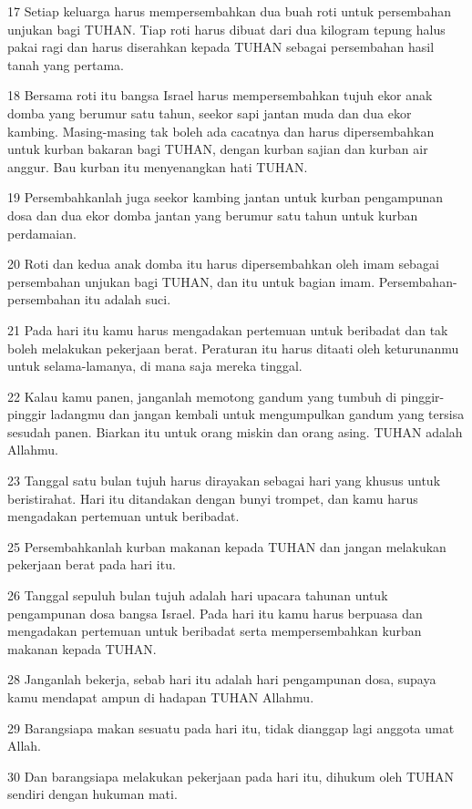 \par 17 Setiap keluarga harus mempersembahkan dua buah roti untuk persembahan unjukan bagi TUHAN. Tiap roti harus dibuat dari dua kilogram tepung halus pakai ragi dan harus diserahkan kepada TUHAN sebagai persembahan hasil tanah yang pertama.
\par 18 Bersama roti itu bangsa Israel harus mempersembahkan tujuh ekor anak domba yang berumur satu tahun, seekor sapi jantan muda dan dua ekor kambing. Masing-masing tak boleh ada cacatnya dan harus dipersembahkan untuk kurban bakaran bagi TUHAN, dengan kurban sajian dan kurban air anggur. Bau kurban itu menyenangkan hati TUHAN.
\par 19 Persembahkanlah juga seekor kambing jantan untuk kurban pengampunan dosa dan dua ekor domba jantan yang berumur satu tahun untuk kurban perdamaian.
\par 20 Roti dan kedua anak domba itu harus dipersembahkan oleh imam sebagai persembahan unjukan bagi TUHAN, dan itu untuk bagian imam. Persembahan-persembahan itu adalah suci.
\par 21 Pada hari itu kamu harus mengadakan pertemuan untuk beribadat dan tak boleh melakukan pekerjaan berat. Peraturan itu harus ditaati oleh keturunanmu untuk selama-lamanya, di mana saja mereka tinggal.
\par 22 Kalau kamu panen, janganlah memotong gandum yang tumbuh di pinggir-pinggir ladangmu dan jangan kembali untuk mengumpulkan gandum yang tersisa sesudah panen. Biarkan itu untuk orang miskin dan orang asing. TUHAN adalah Allahmu.
\par 23 Tanggal satu bulan tujuh harus dirayakan sebagai hari yang khusus untuk beristirahat. Hari itu ditandakan dengan bunyi trompet, dan kamu harus mengadakan pertemuan untuk beribadat.
\par 25 Persembahkanlah kurban makanan kepada TUHAN dan jangan melakukan pekerjaan berat pada hari itu.
\par 26 Tanggal sepuluh bulan tujuh adalah hari upacara tahunan untuk pengampunan dosa bangsa Israel. Pada hari itu kamu harus berpuasa dan mengadakan pertemuan untuk beribadat serta mempersembahkan kurban makanan kepada TUHAN.
\par 28 Janganlah bekerja, sebab hari itu adalah hari pengampunan dosa, supaya kamu mendapat ampun di hadapan TUHAN Allahmu.
\par 29 Barangsiapa makan sesuatu pada hari itu, tidak dianggap lagi anggota umat Allah.
\par 30 Dan barangsiapa melakukan pekerjaan pada hari itu, dihukum oleh TUHAN sendiri dengan hukuman mati.
